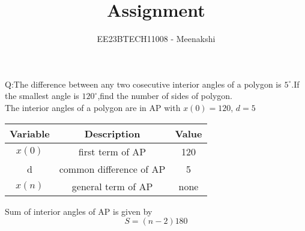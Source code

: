 \documentclass[journal,12pt,twocolumn]{IEEEtran}
\theoremstyle{remark}
\begin{document}
\let\vec\mathbf



\vspace{3cm}
\title{Assignment}
\author{EE23BTECH11008 - Meenakshi}
\maketitle
\newpage
\bigskip

\renewcommand{\thefigure}{\theenumi}
\renewcommand{\thetable}{\theenumi}
Q:The difference between any two cosecutive interior angles of a polygon is $5^\circ$.If the smallest angle is $120^\circ$,find the number of sides of polygon.
\\\solution
The interior angles of a polygon are in AP with
    $x(0)=120$, $d=5$
\begin{table}[ht]
  \centering
  \begin{tabular}{|c|c|c|}
    \hline
      \textbf{Variable}& \textbf{Description}& \textbf{Value}\\\hline
    $x(0)$& first term of AP& 120  \\\hline
    d& common difference of AP & 5\\\hline
    $x(n)$ & general  term of AP&none\\\hline
  \end{tabular}
  \end {table}
Sum of interior angles of AP is given by
\begin{equation}
    S=(n-2)180
\end{equation}
\end{document}
